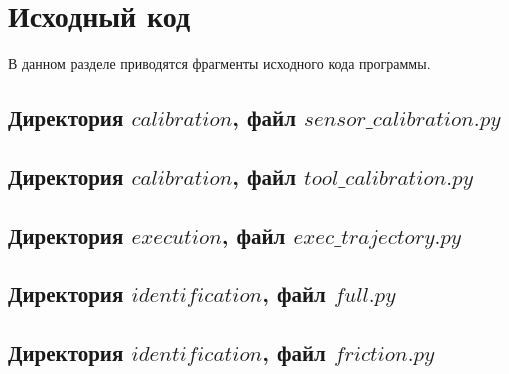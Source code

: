 \documentclass[codelisting]{../espd}
\begin{document}
{\sloppy %
\makelisttitle{\titlemode} %
{
	\cleardoublepage
	
}
{
	\cleardoublepage
	\tableofcontents %
}
%
% 
% 
% 
% 
% 
% 


% 

\newpage\section{Исходный код}

В данном разделе приводятся фрагменты исходного кода программы.

\subsection{Директория $calibration$, файл $sensor\_calibration.py$}


\subsection{Директория $calibration$, файл $tool\_calibration.py$}


\subsection{Директория $execution$, файл $exec\_trajectory.py$}


\subsection{Директория $identification$, файл $full.py$}


\subsection{Директория $identification$, файл $friction.py$}


}
\end{document}

